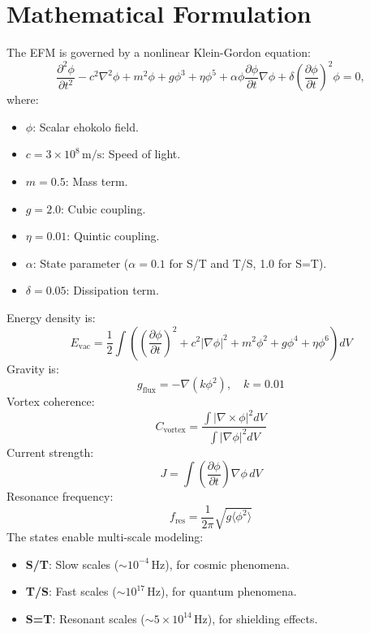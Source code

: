 \documentclass[11pt]{article}
\begin{document}
\section{Mathematical Formulation}
The EFM is governed by a nonlinear Klein-Gordon equation:
\begin{equation}
\frac{\partial^2 \phi}{\partial t^2} - c^2 \nabla^2 \phi + m^2 \phi + g \phi^3 + \eta \phi^5 + \alpha \phi \frac{\partial \phi}{\partial t} \nabla \phi + \delta \left(\frac{\partial \phi}{\partial t}\right)^2 \phi = 0,
\end{equation}
where:
\begin{itemize}
    \item \(\phi\): Scalar ehokolo field.
    \item \(c = 3 \times 10^8 \, \text{m/s}\): Speed of light.
    \item \(m = 0.5\): Mass term.
    \item \(g = 2.0\): Cubic coupling.
    \item \(\eta = 0.01\): Quintic coupling.
    \item \(\alpha\): State parameter (\(\alpha = 0.1\) for S/T and T/S, 1.0 for S=T).
    \item \(\delta = 0.05\): Dissipation term.
\end{itemize}
Energy density is:
\begin{equation}
E_{\text{vac}} = \frac{1}{2} \int \left( \left(\frac{\partial \phi}{\partial t}\right)^2 + c^2 |\nabla \phi|^2 + m^2 \phi^2 + g \phi^4 + \eta \phi^6 \right) dV
\end{equation}
Gravity is:
\begin{equation}
g_{\text{flux}} = - \nabla \left( k \phi^2 \right), \quad k = 0.01
\end{equation}
Vortex coherence:
\begin{equation}
C_{\text{vortex}} = \frac{\int |\nabla \times \phi|^2 dV}{\int |\nabla \phi|^2 dV}
\end{equation}
Current strength:
\begin{equation}
J = \int \left( \frac{\partial \phi}{\partial t} \right) \nabla \phi \, dV
\end{equation}
Resonance frequency:
\begin{equation}
f_{\text{res}} = \frac{1}{2\pi} \sqrt{g \langle \phi^2 \rangle}
\end{equation}
The states enable multi-scale modeling:
\begin{itemize}
    \item \textbf{S/T}: Slow scales (\(\sim 10^{-4} \, \text{Hz}\)), for cosmic phenomena.
    \item \textbf{T/S}: Fast scales (\(\sim 10^{17} \, \text{Hz}\)), for quantum phenomena.
    \item \textbf{S=T}: Resonant scales (\(\sim 5 \times 10^{14} \, \text{Hz}\)), for shielding effects.
\end{itemize}
\end{document}
